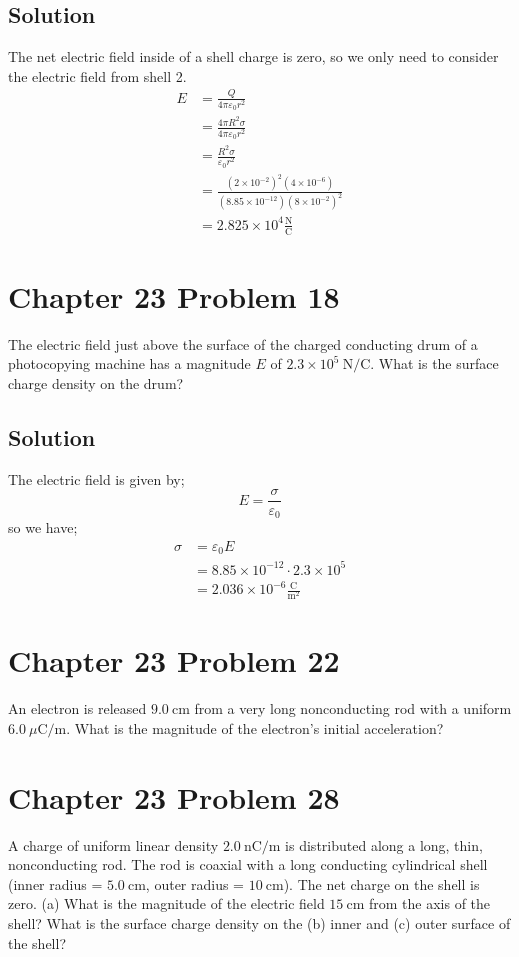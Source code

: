 \documentclass{article}
\newcommand{\m}{\text{m}}
\newcommand{\centi}{\text{c}}
\newcommand{\N}{\text{N}}
\newcommand{\C}{\text{C}}
\begin{document}
\subsection*{Solution}
The net electric field inside of a shell charge is zero, so we only need to consider the electric field from shell 2.
\begin{align*}
    E &= \frac{Q}{4\pi \varepsilon_0 r^2} \\
    &= \frac{4\pi R^2 \sigma}{4\pi \varepsilon_0 r^2}\\
    &= \frac{R^2 \sigma}{\varepsilon_0 r^2} \\
    &= \frac{(2 \times 10^{-2})^2 (4 \times 10^{-6})}{(8.85 \times 10^{-12}) (8 \times 10^{-2})^2} \\
    &= \boxed{2.825 \times 10^4 \frac{\N}{\C}}
\end{align*}

\section*{Chapter 23 Problem 18}
The electric field just above the surface of the charged conducting drum of a photocopying machine has a magnitude $E$ of $2.3 \times 10^5\ \N/\C$. What is the surface charge density on the drum?

\subsection*{Solution}
The electric field is given by;
\[
    E = \frac{\sigma}{\varepsilon_0}
\]
so we have;
\begin{align*}
    \sigma &= \varepsilon_0 E \\
    &= 8.85 \times 10^{-12} \cdot 2.3 \times 10^5 \\
    &= \boxed{2.036 \times 10^{-6} \frac{\C}{\m^2}}
\end{align*}

\section*{Chapter 23 Problem 22}
An electron is released $9.0\ \centi \m$ from a very long nonconducting rod with a uniform $6.0\ \mu\C/\m$. What is the magnitude of the electron's initial acceleration?

\section*{Chapter 23 Problem 28}
A charge of uniform linear density $2.0\ \text{n}\C/\m$ is distributed along a long, thin, nonconducting rod. The rod is coaxial with a long conducting cylindrical shell (inner radius = $5.0\ \centi \m$, outer radius = $10\ \centi \m$). The net charge on the shell is zero. (a) What is the magnitude of the electric field $15\ \centi \m$ from the axis of the shell? What is the surface charge density on the (b) inner and (c) outer surface of the shell?
\end{document}
